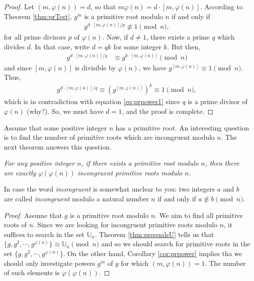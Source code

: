 \documentclass{subfile}
\begin{document}
	\begin{proof}
		Let $(m,\varphi(n))=d$, so that $m\varphi(n)=d\cdot [m,\varphi(n)]$. According to Theorem \ref{thm:prTest}, $g^m$ is a primitive root modulo $n$ if and only if
			\begin{align}\label{eq:prpower1}
			g^{{d\cdot [m,\varphi(n)]}/{p}}\not\equiv1\pmod n,
			\end{align}
		for all prime divisors $p$ of $\varphi(n)$. Now, if $d \neq 1$, there exists a prime $q$ which divides $d$. In that case, write $d=qk$ for some integer $k$. But then,
			\begin{align*}
				g^{{d\cdot [m,\varphi(n)]}/{q}}
					& \equiv g^{k \cdot [m,\varphi(n)]}\pmod n
			\end{align*}
		and since $[m,\varphi(n)]$ is divisible by $\varphi(n)$, we have $g^{ [m,\varphi(n)]} \equiv 1\pmod n$. Thus,
			\begin{align*}
			g^{{d\cdot [m,\varphi(n)]}/{q}} \equiv \left(g^{[m,\varphi(n)]}\right)^k \equiv 1\pmod n,
			\end{align*}
		which is in contradiction with equation \eqref{eq:prpower1} since $q$ is a prime divisor of $\varphi(n)$ (why?). So, we must have $d=1$, and the proof is complete.
	\end{proof}

Assume that some positive integer $n$ has a primitive root. An interesting question is to find the number of primitive roots which are incongruent modulo $n$. The next theorem answers this question.

	\begin{theorem}\slshape\label{thm:npr}
		For any positive integer $n$, if there exists a primitive root modulo $n$, then there are exactly $\varphi(\varphi(n))$ incongruent primitive roots modulo $n$.
	\end{theorem}

	\begin{note}
		In case the word \textit{incongruent} is somewhat unclear to you: two integers $a$ and $b$ are called \textit{incongruent} modulo a natural number $n$ if and only if $a \not \equiv b \pmod n$.
	\end{note}

	\begin{proof}
		Assume that $g$ is a primitive root modulo $n$. We aim to find all primitive roots of $n$. Since we are looking for incongruent primitive roots modulo $n$, it suffices to search in the set $\mathbb U_n$. Theorem \ref{thm:prequalsU} tells us that $\{g,g^2,\cdots,g^{\varphi(n)}\} \equiv \mathbb U_n \pmod n$ and so we should search for primitive roots in the set $\{g,g^2,\cdots,g^{\varphi(n)}\}$. On the other hand, Corollary \ref{cor:prpower} implies tha we should only investigate powers $g^m$ of $g$ for which $(m, \varphi(n))=1$. The number of such elements is $\varphi(\varphi(n))$.
	\end{proof}
\end{document}
